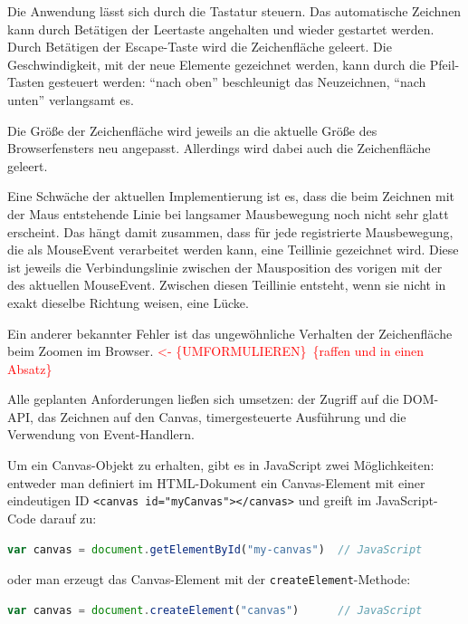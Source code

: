 \documentclass[a4paper, 12pt, hidelinks, listof=totoc, listoftables=totoc, bibliography=totoc]{scrreprt}
\newcommand{\js}[1]{\lstinline[language=JavaScript, style=inline]|#1|}
\newcommand{\html}[1]{\lstinline[language=HTML5, style=inline]|#1|}
\newcommand{\TODOi}[1]{\textcolor{red}{\{#1\}}}
\newcommand{\REDOi}{\textcolor{red}{<- \{UMFORMULIEREN\}~}}
\begin{document}
Die Anwendung lässt sich durch die Tastatur steuern. Das automatische Zeichnen kann durch Betätigen der Leertaste angehalten und wieder gestartet werden. Durch Betätigen der Escape-Taste wird die Zeichenfläche geleert. Die Geschwindigkeit, mit der neue Elemente gezeichnet werden, kann durch die Pfeil-Tasten gesteuert werden: "`nach oben"' beschleunigt das Neuzeichnen, "`nach unten"' verlangsamt es.

Die Größe der Zeichenfläche wird jeweils an die aktuelle Größe des Browserfensters neu angepasst. Allerdings wird dabei auch die Zeichenfläche geleert.

Eine Schwäche der aktuellen Implementierung ist es, dass die beim Zeichnen mit der Maus entstehende Linie bei langsamer Mausbewegung noch nicht sehr glatt erscheint. Das hängt damit zusammen, dass für jede registrierte Mausbewegung, die als MouseEvent verarbeitet werden kann, eine Teillinie gezeichnet wird. Diese ist jeweils die Verbindungslinie zwischen der Mausposition des vorigen mit der des aktuellen MouseEvent. Zwischen diesen Teillinie entsteht, wenn sie nicht in exakt dieselbe Richtung weisen, eine Lücke.

Ein anderer bekannter Fehler ist das ungewöhnliche Verhalten der Zeichenfläche beim Zoomen im Browser. \REDOi \TODOi{raffen und in einen Absatz}



Alle geplanten Anforderungen ließen sich umsetzen: der Zugriff auf die \ac{DOM}-\ac{API}, das Zeichnen auf den Canvas, timergesteuerte Ausführung und die Verwendung von Event-Handlern.

Um ein Canvas-Objekt zu erhalten, gibt es in JavaScript zwei Möglichkeiten: entweder man definiert im HTML-Dokument ein Canvas-Element mit einer eindeutigen ID \html{<canvas id="myCanvas"></canvas>} und greift im JavaScript-Code darauf zu:

\begin{lstlisting}[language=JavaScript, style=snippet]
var canvas = document.getElementById("my-canvas")  // JavaScript
\end{lstlisting}

oder man erzeugt das Canvas-Element mit der \js{createElement}-Methode:

\begin{lstlisting}[language=JavaScript, style=snippet]
var canvas = document.createElement("canvas")      // JavaScript
\end{lstlisting}
\end{document}
